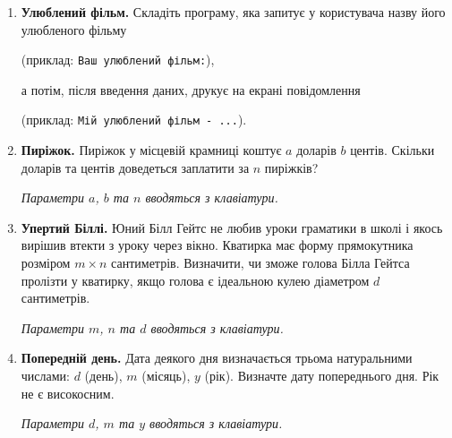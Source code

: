 \documentclass[10pt, a5paper]{scrartcl}
\begin{document}

\begin{enumerate}

\item \textbf{Улюблений фільм.} Складіть програму, яка  запитує у користувача назву його улюбленого фільму

(приклад: \verb|Ваш улюблений фільм:|),

а потім, після введення даних, друкує на екрані повідомлення

(приклад: \verb|Мій улюблений фільм - ...|).

\item \textbf{Пиріжок.} Пиріжок у місцевій крамниці коштує $a$ доларів $b$ центів. Скільки доларів та центів доведеться заплатити за $n$ пиріжків?

{\itshape Параметри $a$, $b$ та $n$ вводяться з клавіатури.}

\item \textbf{Упертий Біллі.} Юний Білл Гейтс не любив уроки граматики в школі і якось вирішив втекти з уроку через вікно. Кватирка має форму прямокутника розміром $ m \times n $ сантиметрів. Визначити, чи зможе голова Білла Гейтса пролізти у кватирку, якщо голова є ідеальною кулею діаметром $d$ сантиметрів.

{\itshape Параметри $m$, $n$ та $d$ вводяться з клавіатури.}

\item \textbf{Попередній день.} Дата деякого дня визначається трьома натуральними числами: $d$ (день), $m$ (місяць), $y$ (рік). Визначте дату попереднього дня. Рік не є високосним.

{\itshape Параметри $d$, $m$ та $y$ вводяться з клавіатури.}


\end{enumerate}
\end{document}
